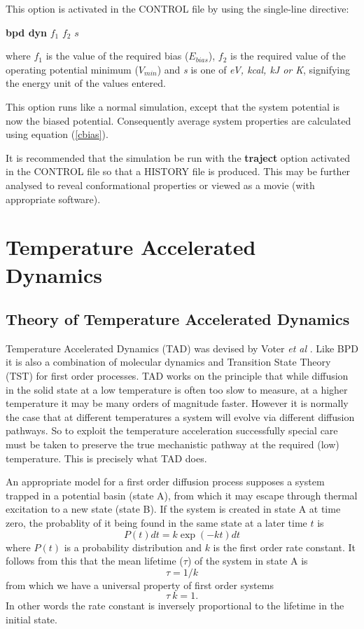 \noindent This option is activated in the CONTROL file by using the 
single-line directive:

{\bf bpd dyn} $f_1$ $f_2$ $s$ 

\noindent where $f_1$ is the value of the required bias ($E_{bias}$), 
$f_2$ is the required value of the operating potential minimum
($V_{min}$) and {\em s} is one of {\em eV, kcal, kJ or K}, signifying
the energy unit of the values entered.

This option runs like a normal \D{} simulation, except that the
system potential is now the biased potential. Consequently average
system properties are calculated using equation (\ref{cbias}). 

It is recommended that the simulation be run with the {\bf traject}
option activated in the CONTROL file so that a HISTORY file is
produced. This may be further analysed to reveal conformational
properties or viewed as a movie (with appropriate software).

\section{Temperature Accelerated Dynamics}
\label{TAD}
\subsection{Theory of Temperature Accelerated Dynamics}

Temperature Accelerated Dynamics (TAD) was devised by Voter {\em et al}
\cite{voter-00a}. Like BPD it is also a combination of molecular
dynamics and Transition State Theory (TST) for first order processes.
TAD works on the principle that while diffusion in the solid state at
a low temperature is often too slow to measure, at a higher
temperature it may be many orders of magnitude faster. However it is
normally the case that at different temperatures a system will
evolve via different diffusion pathways. So to exploit the
temperature acceleration successfully special care must be taken to
preserve the true mechanistic pathway at the required (low)
temperature. This is precisely what TAD does.

An appropriate model for a first order diffusion process supposes a
system trapped in a potential basin (state A), from which it may
escape through thermal excitation to a new state (state B). If the
system is created in state A at time zero, the probablity of it being
found in the same state at a later time $t$ is
\begin{equation}
P(t)dt=k \exp(-k t) dt
\end{equation}
where $P(t)$ is a probability distribution and $k$ is the first order
rate constant. It follows from this that the mean lifetime ($\tau$) of
the system in state A is
\begin{equation}
	\tau=1/k
\end{equation}
from which we have a universal property of first order systems
\begin{equation}
\tau~k=1. \label{upf}
\end{equation}
In other words the rate constant is inversely proportional to the
lifetime in the initial state.

